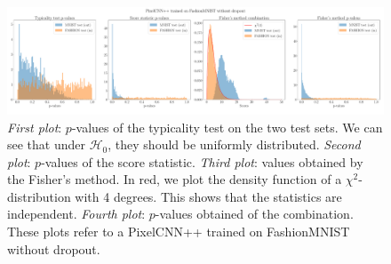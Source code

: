 {\begin{figure}
    \includegraphics[width=\textwidth]{graphics/paper_modelagnostic/pvalues_comb_no_drop_correct_font.pdf}
    \caption[Distribution of the p-values of the typicality test, score statistic, Fisher's method and a combination of all.]{ \emph{First plot}: $p$-values of the typicality test on the two test sets. We can see that under $\mathcal{H}_0$, they should be uniformly distributed. \emph{Second plot}: $p$-values of the score statistic. \emph{Third plot}: values obtained by the Fisher's method. In red, we plot the density function of a $\chi^2$-distribution with 4 degrees. This shows that the statistics are independent. \emph{Fourth plot}: $p$-values obtained of the combination. These plots refer to a PixelCNN++ trained on FashionMNIST without dropout.}
    \label{fig_modelagnostic:comb_p_values}
\end{figure} 

}
